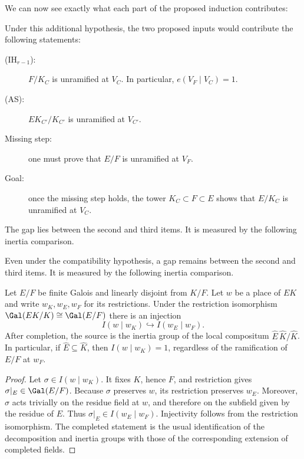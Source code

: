 {\color{red}
We can now see exactly what each part of the proposed induction contributes:
\par}
{\color{blue}
Under this additional hypothesis, the two proposed inputs would contribute
the following statements:
\par}
\begin{description}
  \item[\textnormal{(IH$_{r-1}$):}]
    $F/K_C$ is unramified at $V_C$. In particular,
    $e(V_F\mid V_C)=1$.
  \item[\textnormal{(AS):}]
    $EK_{C'}/K_{C'}$ is unramified at $V_{C'}$.
  \item[Missing step:]
    one must prove that $E/F$ is unramified at $V_F$.
  \item[Goal:]
    once the missing step holds, the tower
    $K_C\subset F\subset E$ shows that $E/K_C$ is unramified at $V_C$.
\end{description}

{\color{red}
The gap lies between the second and third items. It is measured by the
following inertia comparison.
\par}
{\color{blue}
Even under the compatibility hypothesis, a gap remains between the second
and third items. It is measured by the following inertia comparison.
\par}

\begin{lemma}\label{lem:inertia-injection}
Let $E/F$ be finite Galois and linearly disjoint from $K/F$. Let $w$ be a
place of $EK$ and write $w_K,w_E,w_F$ for its restrictions. Under the
restriction isomorphism $\Gal(EK/K)\cong\Gal(E/F)$ there is an injection
\[
I(w\mid w_K)\hookrightarrow I(w_E\mid w_F).
\]
After completion, the source is the inertia group of the local compositum
$\widehat E\,\widehat K/\widehat K$. In particular, if
$\widehat E\subseteq\widehat K$, then $I(w\mid w_K)=1$, regardless of the
ramification of $E/F$ at $w_F$.
\end{lemma}

\begin{proof}
Let $\sigma\in I(w\mid w_K)$. It fixes $K$, hence $F$, and restriction gives
$\sigma|_E\in\Gal(E/F)$. Because $\sigma$ preserves $w$, its restriction
preserves $w_E$. Moreover, $\sigma$ acts trivially on the residue field at
$w$, and therefore on the subfield given by the residue of $E$. Thus
$\sigma|_E\in I(w_E\mid w_F)$. Injectivity follows from the restriction
isomorphism. The completed statement is the usual identification of the
decomposition and inertia groups with those of the corresponding extension
of completed fields.
\end{proof}

